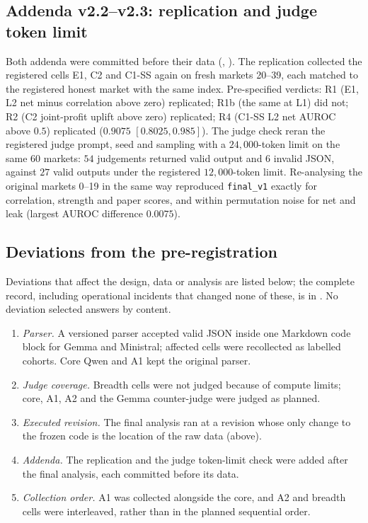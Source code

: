 \subsection{Addenda v2.2--v2.3: replication and judge token limit}
\label{app:addenda}
Both addenda were committed before their data (,
). The replication collected the registered cells E1, C2 and
C1-SS again on fresh markets 20--39, each matched to the registered honest
market with the same index. Pre-specified verdicts: R1 (E1, L2 net minus
correlation above zero) replicated; R1b (the same at L1) did not; R2 (C2
joint-profit uplift above zero) replicated; R4 (C1-SS L2 net AUROC above
$0.5$) replicated ($0.9075$ $[0.8025,0.985]$).
The judge check reran the registered judge prompt, seed and sampling with a
$24{,}000$-token limit on the same 60 markets: $54$ judgements returned
valid output and $6$ invalid JSON, against $27$ valid outputs under the
registered $12{,}000$-token limit.
Re-analysing the original markets 0--19 in the same way reproduced
\texttt{final\_v1} exactly for correlation, strength and paper scores, and
within permutation noise for net and leak (largest AUROC difference
$0.0075$).



\subsection{Deviations from the pre-registration}
\label{app:deviations}
Deviations that affect the design, data or analysis are listed below; the
complete record, including operational incidents that changed none of
these, is in . No deviation selected answers by
content.
\begin{enumerate}
\setlength{\itemsep}{0pt}
\item \emph{Parser.} A versioned parser accepted valid JSON inside one
Markdown code block for Gemma and Ministral; affected cells were recollected
as labelled cohorts. Core Qwen and A1 kept the original parser.
\item \emph{Judge coverage.} Breadth cells were not judged because of compute
limits; core, A1, A2 and the Gemma counter-judge were judged as planned.
\item \emph{Executed revision.} The final analysis ran at a revision whose
only change to the frozen code is the location of the raw data (above).
\item \emph{Addenda.} The replication and the judge token-limit check were
added after the final analysis, each committed before its data.
\item \emph{Collection order.} A1 was collected alongside the core, and A2
and breadth cells were interleaved, rather than in the planned sequential
order.
\end{enumerate}

